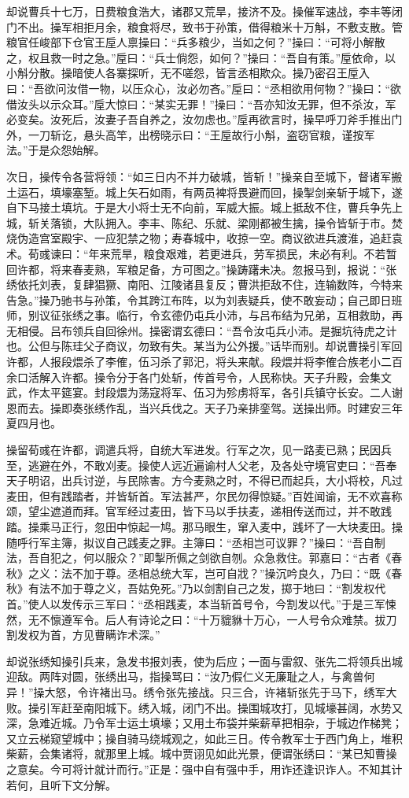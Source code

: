 却说曹兵十七万，日费粮食浩大，诸郡又荒旱，接济不及。操催军速战，李丰等闭门不出。操军相拒月余，粮食将尽，致书于孙策，借得粮米十万斛，不敷支散。管粮官任峻部下仓官王垕人禀操曰：“兵多粮少，当如之何？”操曰：“可将小解散之，权且救一时之急。”垕曰：“兵士倘怨，如何？”操曰：“吾自有策。”垕依命，以小斛分散。操暗使人各寨探听，无不嗟怨，皆言丞相欺众。操乃密召王垕入曰：“吾欲问汝借一物，以压众心，汝必勿吝。”垕曰：“丞相欲用何物？”操曰：“欲借汝头以示众耳。”垕大惊曰：“某实无罪！”操曰：“吾亦知汝无罪，但不杀汝，军必变矣。汝死后，汝妻子吾自养之，汝勿虑也。”垕再欲言时，操早呼刀斧手推出门外，一刀斩讫，悬头高竿，出榜晓示曰：“王垕故行小斛，盗窃官粮，谨按军法。”于是众怨始解。

次日，操传令各营将领：“如三日内不并力破城，皆斩！”操亲自至城下，督诸军搬土运石，填壕塞堑。城上矢石如雨，有两员裨将畏避而回，操掣剑亲斩于城下，遂自下马接土填坑。于是大小将士无不向前，军威大振。城上抵敌不住，曹兵争先上城，斩关落锁，大队拥入。李丰、陈纪、乐就、梁刚都被生擒，操令皆斩于市。焚烧伪造宫室殿宇、一应犯禁之物；寿春城中，收掠一空。商议欲进兵渡淮，追赶袁术。荀彧谏曰：“年来荒旱，粮食艰难，若更进兵，劳军损民，未必有利。不若暂回许都，将来春麦熟，军粮足备，方可图之。”操踌躇未决。忽报马到，报说：“张绣依托刘表，复肆猖獗、南阳、江陵诸县复反；曹洪拒敌不住，连输数阵，今特来告急。”操乃驰书与孙策，令其跨江布阵，以为刘表疑兵，使不敢妄动；自己即日班师，别议征张绣之事。临行，令玄德仍屯兵小沛，与吕布结为兄弟，互相救助，再无相侵。吕布领兵自回徐州。操密谓玄德曰：“吾令汝屯兵小沛。是掘坑待虎之计也。公但与陈珪父子商议，勿致有失。某当为公外援。”话毕而别。却说曹操引军回许都，人报段煨杀了李傕，伍习杀了郭汜，将头来献。段煨并将李傕合族老小二百余口活解入许都。操令分于各门处斩，传首号令，人民称快。天子升殿，会集文武，作太平筵宴。封段煨为荡寇将军、伍习为殄虏将军，各引兵镇守长安。二人谢恩而去。操即奏张绣作乱，当兴兵伐之。天子乃亲排銮驾。送操出师。时建安三年夏四月也。

操留荀彧在许都，调遣兵将，自统大军进发。行军之次，见一路麦已熟；民因兵至，逃避在外，不敢刈麦。操使人远近遍谕村人父老，及各处守境官吏曰：“吾奉天子明诏，出兵讨逆，与民除害。方今麦熟之时，不得已而起兵，大小将校，凡过麦田，但有践踏者，并皆斩首。军法甚严，尔民勿得惊疑。”百姓闻谕，无不欢喜称颂，望尘遮道而拜。官军经过麦田，皆下马以手扶麦，递相传送而过，并不敢践踏。操乘马正行，忽田中惊起一鸠。那马眼生，窜入麦中，践坏了一大块麦田。操随呼行军主簿，拟议自己践麦之罪。主簿曰：“丞相岂可议罪？”操曰：“吾自制法，吾自犯之，何以服众？”即掣所佩之剑欲自刎。众急救住。郭嘉曰：“古者《春秋》之义：法不加于尊。丞相总统大军，岂可自戕？”操沉吟良久，乃曰：“既《春秋》有法不加于尊之义，吾姑免死。”乃以剑割自己之发，掷于地曰：“割发权代首。”使人以发传示三军曰：“丞相践麦，本当斩首号令，今割发以代。”于是三军悚然，无不懔遵军令。后人有诗论之曰：“十万貔貅十万心，一人号令众难禁。拔刀割发权为首，方见曹瞒诈术深。”

却说张绣知操引兵来，急发书报刘表，使为后应；一面与雷叙、张先二将领兵出城迎敌。两阵对圆，张绣出马，指操骂曰：“汝乃假仁义无廉耻之人，与禽兽何异！”操大怒，令许褚出马。绣令张先接战。只三合，许褚斩张先于马下，绣军大败。操引军赶至南阳城下。绣入城，闭门不出。操围城攻打，见城壕甚阔，水势又深，急难近城。乃令军士运土填壕；又用土布袋并柴薪草把相杂，于城边作梯凳；又立云梯窥望城中；操自骑马绕城观之，如此三日。传令教军士于西门角上，堆积柴薪，会集诸将，就那里上城。城中贾诩见如此光景，便谓张绣曰：“某已知曹操之意矣。今可将计就计而行。”正是：强中自有强中手，用诈还逢识诈人。不知其计若何，且听下文分解。